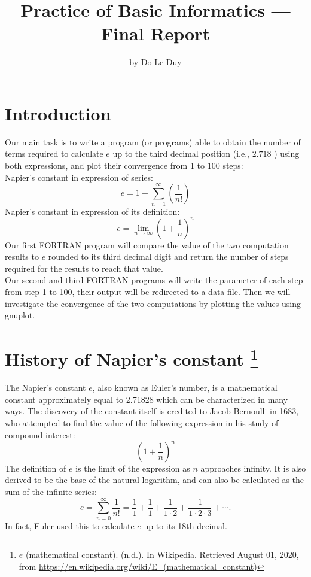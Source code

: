 \documentclass[11pt]{article}
\title{Practice of Basic Informatics — Final Report \vspace{-2ex}}
\author{by Do Le Duy}
\begin{document}
\maketitle

\section{Introduction}
Our main task is to write a program (or programs) able to obtain the number of terms required to calculate $e$ up to the third decimal position (i.e., $2.718$ ) using both expressions, and plot their convergence from 1 to 100 steps:\\
Napier's constant in expression of series:
\[
e=1+\sum_{n=1}^{\infty}\left(\frac{1}{n !}\right)
\]
Napier's constant in expression of its definition: 
\[
e=\lim _{n \rightarrow \infty}\left(1+\frac{1}{n}\right)^{n}
\]
Our first FORTRAN program will compare the value of the two computation results to $e$ rounded to its third decimal digit and return the number of steps required for the results to reach that value.\\
Our second and third FORTRAN programs will write the parameter of each step from step 1 to 100, their output will be redirected to a data file. Then we will investigate the convergence of the two computations by plotting the values using gnuplot.  

\section[title]{History of Napier’s constant \footnote{$e$ (mathematical constant). (n.d.). In Wikipedia. Retrieved August 01, 2020, from \url{https://en.wikipedia.org/wiki/E_(mathematical_constant)}}}

The Napier’s constant $e$, also known as Euler's number, is a mathematical constant approximately equal to 2.71828 which can be characterized in many ways. The discovery of the constant itself is credited to Jacob Bernoulli in 1683, who attempted to find the value of the following expression in his study of compound interest:
\[ 
\left( 1+ \frac{1}{n} \right)^{n}
\]
The definition of $e$ is the limit of the expression as $n$ approaches infinity. It is also derived to be the base of the natural logarithm, and can also be calculated as the sum of the infinite series:
\[
e=\sum_{n=0}^{\infty} \frac{1}{n !}=\frac{1}{1}+\frac{1}{1}+\frac{1}{1 \cdot 2}+\frac{1}{1 \cdot 2 \cdot 3}+\cdots.
\]
In fact, Euler used this to calculate $e$ up to its 18th decimal. 
\end{document}
